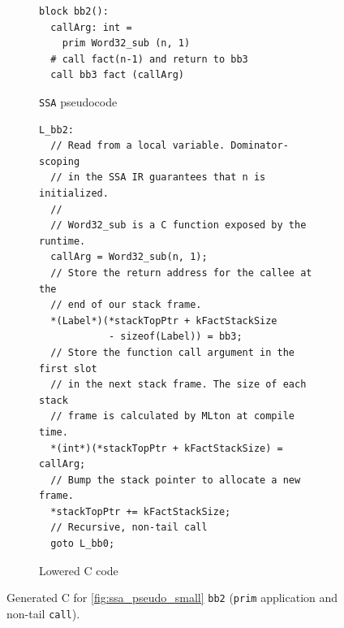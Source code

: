 \begin{figure}[htbp]
  \centering
  \begin{subfigure}[t]{0.42\textwidth}
    \caption{\texttt{SSA} pseudocode}
    \label{fig:ssa_pseudo_small_bb2}
    \vspace{1mm}
\begin{verbatim}
block bb2():
  callArg: int =
    prim Word32_sub (n, 1)
  # call fact(n-1) and return to bb3
  call bb3 fact (callArg)
\end{verbatim}
  \end{subfigure}\hfill
  \begin{subfigure}[t]{0.55\textwidth}
    \caption{Lowered C code}
    \label{fig:c_pseudo_small_bb2}
    \vspace{1mm}
\begin{verbatim}
L_bb2:
  // Read from a local variable. Dominator-scoping
  // in the SSA IR guarantees that n is initialized.
  //
  // Word32_sub is a C function exposed by the runtime.
  callArg = Word32_sub(n, 1);
  // Store the return address for the callee at the
  // end of our stack frame.
  *(Label*)(*stackTopPtr + kFactStackSize
            - sizeof(Label)) = bb3;
  // Store the function call argument in the first slot
  // in the next stack frame. The size of each stack
  // frame is calculated by MLton at compile time.
  *(int*)(*stackTopPtr + kFactStackSize) = callArg;
  // Bump the stack pointer to allocate a new frame.
  *stackTopPtr += kFactStackSize;
  // Recursive, non-tail call
  goto L_bb0;
\end{verbatim}
  \end{subfigure}
  \caption{Generated C for \cref{fig:ssa_pseudo_small} \texttt{bb2} (\texttt{prim} application and non-tail \texttt{call}).}
  \label{fig:pseudo_small_bb2}
\end{figure}

